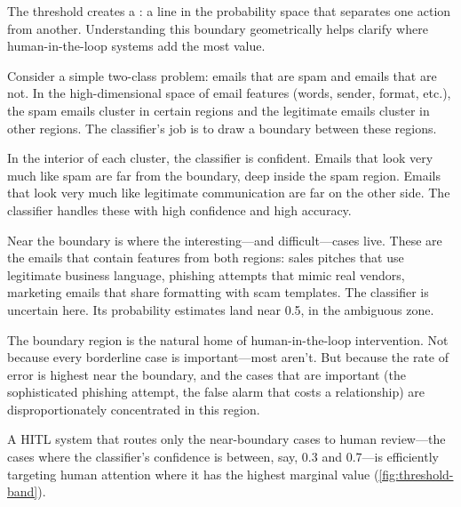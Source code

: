 The threshold creates a : a line in the probability space that separates one action from another. Understanding this boundary geometrically helps clarify where human-in-the-loop systems add the most value.

Consider a simple two-class problem: emails that are spam and emails that are not. In the high-dimensional space of email features (words, sender, format, etc.), the spam emails cluster in certain regions and the legitimate emails cluster in other regions. The classifier's job is to draw a boundary between these regions.

In the interior of each cluster, the classifier is confident. Emails that look very much like spam are far from the boundary, deep inside the spam region. Emails that look very much like legitimate communication are far on the other side. The classifier handles these with high confidence and high accuracy.

Near the boundary is where the interesting---and difficult---cases live. These are the emails that contain features from both regions: sales pitches that use legitimate business language, phishing attempts that mimic real vendors, marketing emails that share formatting with scam templates. The classifier is uncertain here. Its probability estimates land near 0.5, in the ambiguous zone.

\begin{keyconcept}
The boundary region is the natural home of human-in-the-loop intervention. Not because every borderline case is important---most aren't. But because the rate of error is highest near the boundary, and the cases that are important (the sophisticated phishing attempt, the false alarm that costs a relationship) are disproportionately concentrated in this region.

A HITL system that routes only the near-boundary cases to human review---the cases where the classifier's confidence is between, say, 0.3 and 0.7---is efficiently targeting human attention where it has the highest marginal value (\cref{fig:threshold-band}).
\end{keyconcept}

